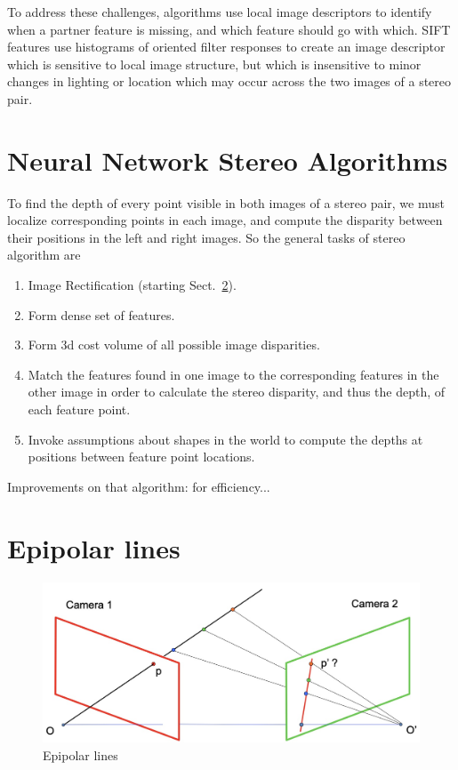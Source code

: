 To address these challenges, algorithms use local image descriptors to identify when a partner feature is missing, and which feature should go with which.  SIFT features  \cite{Lowe04} use histograms of oriented filter responses to create an image descriptor which is sensitive to local image structure, but which is insensitive to minor changes in lighting or location which may occur across the two images of a stereo pair.

\section{Neural Network Stereo Algorithms}


To find the depth of every point visible in both images of a stereo pair, we must localize corresponding points in each image, and compute the disparity between their positions in the left and right images. So the general tasks of stereo algorithm are

\begin{enumerate}
    \item Image Rectification (starting Sect.~\ref{sect:epipolar}).
    \item Form dense set of features.
    \item Form 3d cost volume of all possible image disparities.
    \item Match the features found in one image to the corresponding features in the other image in order to calculate the stereo disparity, and thus the depth, of each feature point.
    \item Invoke assumptions about shapes in the world to compute the depths at positions between feature point locations.
\end{enumerate}

Improvements on that algorithm:  for efficiency...



\section{Epipolar lines}
\label{sect:epipolar}
\begin{figure}
\centerline{
\includegraphics[width=0.8\linewidth]{figures/stereo/epipolar.jpg}
}
\caption{Epipolar lines}
\label{fig:epipolar}
\end{figure}


